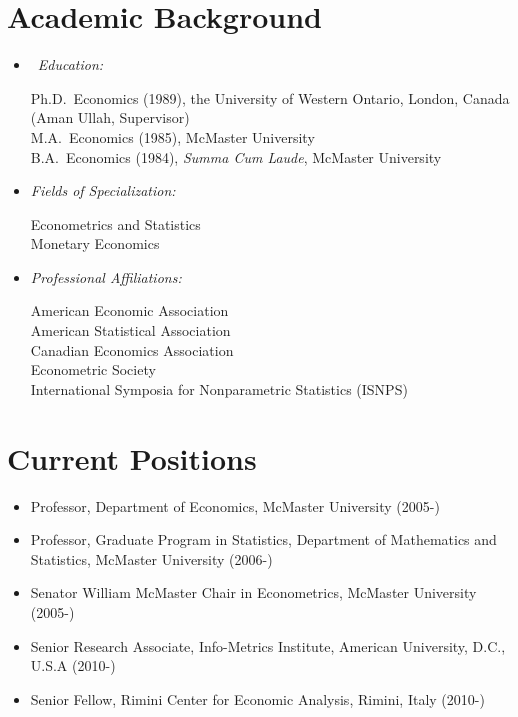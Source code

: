 \documentclass[
]{article}
\begin{document}
\section*{Academic Background}\label{academic-background}

\begin{itemize}
\item
  \faGraduationCap~\emph{Education:}

  Ph.D.~Economics (1989), the University of Western Ontario, London,
  Canada (Aman Ullah, Supervisor)\\
  M.A.~Economics (1985), McMaster University\\
  B.A.~Economics (1984), \emph{Summa Cum Laude}, McMaster University
\item
  \emph{Fields of Specialization:}

  Econometrics and Statistics\\
  Monetary Economics
\item
  \emph{Professional Affiliations:}

  American Economic Association\\
  American Statistical Association\\
  Canadian Economics Association\\
  Econometric Society\\
  International Symposia for Nonparametric Statistics (ISNPS)
\end{itemize}

\section*{Current Positions}\label{current-positions}

\begin{itemize}
\item
  Professor, Department of Economics, McMaster University (2005-)
\item
  Professor, Graduate Program in Statistics, Department of Mathematics
  and Statistics, McMaster University (2006-)
\item
  Senator William McMaster Chair in Econometrics, McMaster University
  (2005-)
\item
  Senior Research Associate, Info-Metrics Institute, American
  University, D.C., U.S.A (2010-)
\item
  Senior Fellow, Rimini Center for Economic Analysis, Rimini, Italy
  (2010-)
\end{itemize}
\end{document}
